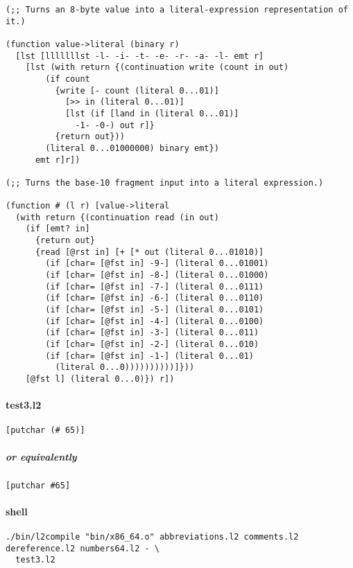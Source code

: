 \documentclass[]{article}
\let\oldparagraph\paragraph
\renewcommand{\paragraph}[1]{\oldparagraph{#1}\mbox{}}
\let\oldsubparagraph\subparagraph
\renewcommand{\subparagraph}[1]{\oldsubparagraph{#1}\mbox{}}
\begin{document}
\begin{verbatim}
(;; Turns an 8-byte value into a literal-expression representation of it.)

(function value->literal (binary r)
  [lst [lllllllst -l- -i- -t- -e- -r- -a- -l- emt r]
    [lst (with return {(continuation write (count in out)
        (if count
          {write [- count (literal 0...01)]
            [>> in (literal 0...01)]
            [lst (if [land in (literal 0...01)]
              -1- -0-) out r]}
          {return out}))
        (literal 0...01000000) binary emt})
      emt r]r])

(;; Turns the base-10 fragment input into a literal expression.)

(function # (l r) [value->literal
  (with return {(continuation read (in out)
    (if [emt? in]
      {return out}
      {read [@rst in] [+ [* out (literal 0...01010)]
        (if [char= [@fst in] -9-] (literal 0...01001)
        (if [char= [@fst in] -8-] (literal 0...01000)
        (if [char= [@fst in] -7-] (literal 0...0111)
        (if [char= [@fst in] -6-] (literal 0...0110)
        (if [char= [@fst in] -5-] (literal 0...0101)
        (if [char= [@fst in] -4-] (literal 0...0100)
        (if [char= [@fst in] -3-] (literal 0...011)
        (if [char= [@fst in] -2-] (literal 0...010)
        (if [char= [@fst in] -1-] (literal 0...01)
          (literal 0...0))))))))))]}))
    [@fst l] (literal 0...0)}) r])
\end{verbatim}

\paragraph{test3.l2}\label{test3.l2}

\begin{verbatim}
[putchar (# 65)]
\end{verbatim}

\subparagraph{or equivalently}\label{or-equivalently-1}

\begin{verbatim}
[putchar #65]
\end{verbatim}

\paragraph{shell}\label{shell-2}

\begin{verbatim}
./bin/l2compile "bin/x86_64.o" abbreviations.l2 comments.l2 dereference.l2 numbers64.l2 - \
  test3.l2
\end{verbatim}
\end{document}
